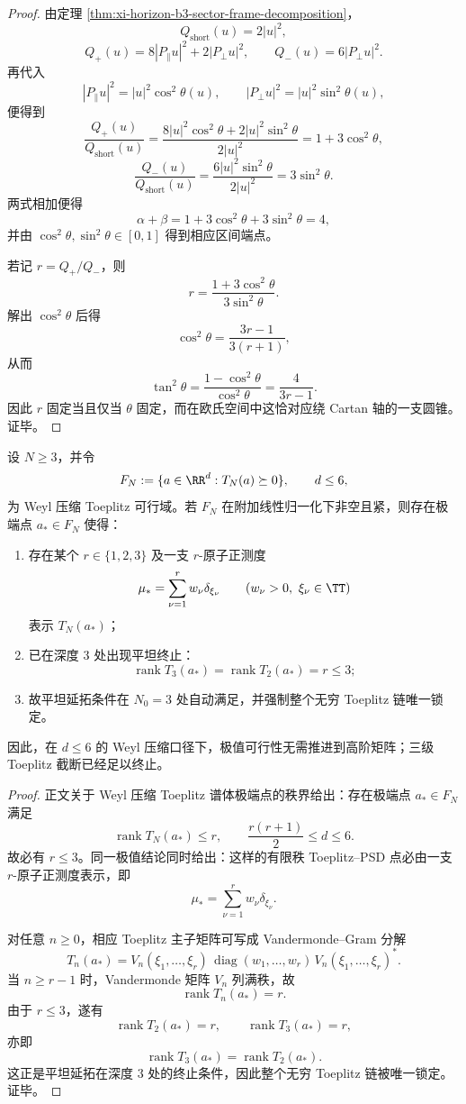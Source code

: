 \begin{proof}
由定理 \ref{thm:xi-horizon-b3-sector-frame-decomposition}，
\[
Q_{\mathrm{short}}(u)=2|u|^2,
\]
\[
Q_+(u)=8|P_{\parallel}u|^2+2|P_{\perp}u|^2,
\qquad
Q_-(u)=6|P_{\perp}u|^2.
\]
再代入
\[
|P_{\parallel}u|^2=|u|^2\cos^2\theta(u),
\qquad
|P_{\perp}u|^2=|u|^2\sin^2\theta(u),
\]
便得到
\[
\frac{Q_+(u)}{Q_{\mathrm{short}}(u)}
=
\frac{8|u|^2\cos^2\theta+2|u|^2\sin^2\theta}{2|u|^2}
=
1+3\cos^2\theta,
\]
\[
\frac{Q_-(u)}{Q_{\mathrm{short}}(u)}
=
\frac{6|u|^2\sin^2\theta}{2|u|^2}
=
3\sin^2\theta.
\]
两式相加便得
\[
\alpha+\beta
=
1+3\cos^2\theta+3\sin^2\theta
=
4,
\]
并由 \(\cos^2\theta,\sin^2\theta\in[0,1]\) 得到相应区间端点。

若记 \(r=Q_+/Q_-\)，则
\[
r=\frac{1+3\cos^2\theta}{3\sin^2\theta}.
\]
解出 \(\cos^2\theta\) 后得
\[
\cos^2\theta=\frac{3r-1}{3(r+1)},
\]
从而
\[
\tan^2\theta
=
\frac{1-\cos^2\theta}{\cos^2\theta}
=
\frac{4}{3r-1}.
\]
因此 \(r\) 固定当且仅当 \(\theta\) 固定，而在欧氏空间中这恰对应绕 Cartan 轴的一支圆锥。证毕。
\end{proof}
\begin{theorem}\label{thm:conclusion-window6-weyl-toeplitz-depth-three-termination}
设 \(N\ge 3\)，并令
\[
F_N:=\{a\in\RR^d:T_N(a)\succeq 0\},
\qquad d\le 6,
\]
为 Weyl 压缩 Toeplitz 可行域。若 \(F_N\) 在附加线性归一化下非空且紧，则存在极端点 \(a_\ast\in F_N\) 使得：
\begin{enumerate}
  \item 存在某个 \(r\in\{1,2,3\}\) 及一支 \(r\)-原子正测度
  \[
  \mu_\ast=\sum_{\nu=1}^r w_\nu\delta_{\xi_\nu}
  \qquad (w_\nu>0,\ \xi_\nu\in\TT)
  \]
  表示 \(T_N(a_\ast)\)；
  \item 已在深度 \(3\) 处出现平坦终止：
  \[
  \operatorname{rank}T_3(a_\ast)=\operatorname{rank}T_2(a_\ast)=r\le 3;
  \]
  \item 故平坦延拓条件在 \(N_0=3\) 处自动满足，并强制整个无穷 Toeplitz 链唯一锁定。
\end{enumerate}
因此，在 \(d\le 6\) 的 Weyl 压缩口径下，极值可行性无需推进到高阶矩阵；三级 Toeplitz 截断已经足以终止。
\end{theorem}
\begin{proof}
正文关于 Weyl 压缩 Toeplitz 谱体极端点的秩界给出：存在极端点 \(a_\ast\in F_N\) 满足
\[
\operatorname{rank}T_N(a_\ast)\le r,
\qquad
\frac{r(r+1)}{2}\le d\le 6.
\]
故必有 \(r\le 3\)。同一极值结论同时给出：这样的有限秩 Toeplitz--PSD 点必由一支 \(r\)-原子正测度表示，即
\[
\mu_\ast=\sum_{\nu=1}^r w_\nu\delta_{\xi_\nu}.
\]

对任意 \(n\ge 0\)，相应 Toeplitz 主子矩阵可写成 Vandermonde--Gram 分解
\[
T_n(a_\ast)=V_n(\xi_1,\dots,\xi_r)\,\operatorname{diag}(w_1,\dots,w_r)\,V_n(\xi_1,\dots,\xi_r)^\ast.
\]
当 \(n\ge r-1\) 时，Vandermonde 矩阵 \(V_n\) 列满秩，故
\[
\operatorname{rank}T_n(a_\ast)=r.
\]
由于 \(r\le 3\)，遂有
\[
\operatorname{rank}T_2(a_\ast)=r,
\qquad
\operatorname{rank}T_3(a_\ast)=r,
\]
亦即
\[
\operatorname{rank}T_3(a_\ast)=\operatorname{rank}T_2(a_\ast).
\]
这正是平坦延拓在深度 \(3\) 处的终止条件，因此整个无穷 Toeplitz 链被唯一锁定。证毕。
\end{proof}

